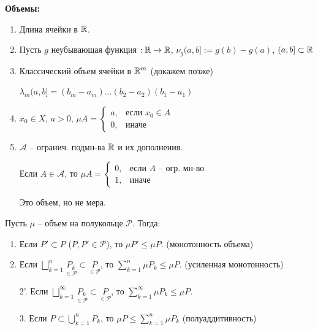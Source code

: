 \begin{example}
    \textbf{Объемы:}

    \begin{enumerate}
        \item Длина ячейки в $\mathbb{R}$.
        \item Пусть $g$ неубывающая функция $:\mathbb{R}\rightarrow \mathbb{R}$, $\nu_g(a, b]:=g(b)- g(a)$, $(a, b]\subset \mathbb{R}$
        \item Классический объем ячейки в $\mathbb{R}^m$ (докажем позже)
        
        $\lambda_m(a, b] = (b_m - a_m)...(b_2 - a_2)(b_1 - a_1)$
        \item $x_0\in X$, $a>0$, $\mu A =\left\{\begin{array}{ll}
            a, & \text{если } x_0\in A  \\
            0, & \text{иначе} 
       \end{array}\right.$
        \item $\mathcal{A}$ – огранич. подмн-ва $\mathbb{R}$ и их дополнения. 
        
        Если $A\in \mathcal{A}$, то $\mu A=\left\{\begin{array}{ll}
            0, & \text{если } A \text{ – огр. мн-во}  \\
            1, & \text{иначе} 
        \end{array}\right.$

        Это объем, но не мера.
    \end{enumerate}
\end{example}

\begin{theorem}
    Пусть $\mu$ – объем на полукольце $\mathcal{P}$. Тогда:

    \begin{enumerate}
        \item Если $P'\subset P$ ($P, P'\in \mathcal{P}$), то $\mu P' \leq \mu P$. (монотонность объема)
        \item Если $\bigsqcup\limits_{k=1}^n \underset{\in\mathcal{P}}{P_k}\subset \underset{\in\mathcal{P}}{P}$, то $\sum\limits_{k=1}^n \mu P_k \leq \mu P$. (усиленная монотонность)
        \item[2'.] Если $\bigsqcup\limits_{k=1}^\infty \underset{\in\mathcal{P}}{P_k}\subset \underset{\in\mathcal{P}}{P}$, то $\sum\limits_{k=1}^\infty \mu P_k \leq \mu P$.
        \item[3.] Если $P\subset \bigcup\limits_{k=1}^n P_k$, то $\mu P \leq \sum\limits_{k=1}^n \mu P_k$ (полуаддитивность)
    \end{enumerate}
\end{theorem}

